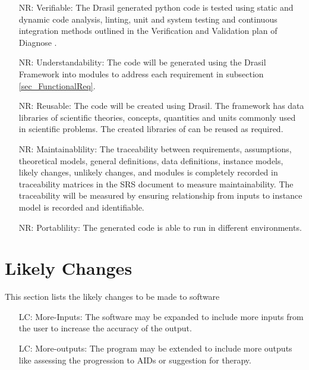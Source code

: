 \documentclass[12pt]{article}
\newcounter{reqnum} %
\newcounter{nreqnum} %
\newcounter{lcnum} %
\begin{document}
\noindent \begin{itemize}

\item[NR\refstepcounter{nreqnum}\thenreqnum \label{NR_Verifiable}:] 
Verifiable: The Drasil generated python code is tested using static and dynamic 
code analysis, linting, unit and system testing and continuous integration 
methods outlined in the Verification and Validation plan of Diagnose 
\citep{DiagnoseVNVplan}.


\item[NR\refstepcounter{nreqnum}\thenreqnum \label{NR_Understandability}:] 
Understandability: The code will be generated using the Drasil Framework into 
modules to address each requirement in subsection \ref{sec_FunctionalReq}.

\item[NR\refstepcounter{nreqnum}\thenreqnum \label{NR_Reusable}:] 
Reusable: The code will be created using Drasil. The framework has data 
libraries of scientific theories, concepts, quantities and units commonly used 
in scientific problems. The created libraries of \progname{} can be reused as 
required. \citep{Drasilcreate}

\item[NR\refstepcounter{nreqnum}\thenreqnum \label{NR_Maintainability}:] 
Maintainablility: The traceability between requirements, assumptions, 
theoretical models, general 
definitions, data definitions, instance models, likely changes, unlikely 
changes, and modules is completely recorded in traceability matrices in the SRS 
document to measure maintainability. The traceability will be measured by 
ensuring relationship from inputs to instance model is recorded and 
identifiable.

\item[NR\refstepcounter{nreqnum}\thenreqnum \label{NR_Portablility}:] 
Portablility: The generated code is able to run in different environments. 


\end{itemize}


\section{Likely Changes} 

This section lists the likely changes to be made to software   

\noindent \begin{itemize}

\item[LC\refstepcounter{lcnum}\thelcnum\label{LC_more_inputs}:] More-Inputs: The 
software may be expanded to include more inputs from the user to increase the 
accuracy of the output.

\item[LC\refstepcounter{lcnum}\thelcnum\label{LC_more_outputs}:] 
More-outputs: The program may be extended to include more outputs like assessing 
the progression to AIDs or suggestion for therapy.
\end{itemize}
\end{document}

